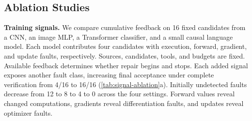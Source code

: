 \documentclass{article}
\begin{document}
\subsection{Ablation Studies}
\label{sec:ablations}

\textbf{Training signals.} We compare cumulative feedback on 16 fixed candidates from a CNN, an image MLP, a Transformer classifier, and a small causal language model. Each model contributes four candidates with execution, forward, gradient, and update faults, respectively. Sources, candidates, tools, and budgets are fixed. Available feedback determines whether repair begins and stops. Each added signal exposes another fault class, increasing final acceptance under complete verification from 4/16 to 16/16 (\cref{tab:signal-ablation}a). Initially undetected faults decrease from 12 to 8 to 4 to 0 across the four settings. Forward values reveal changed computations, gradients reveal differentiation faults, and updates reveal optimizer faults.
\end{document}
